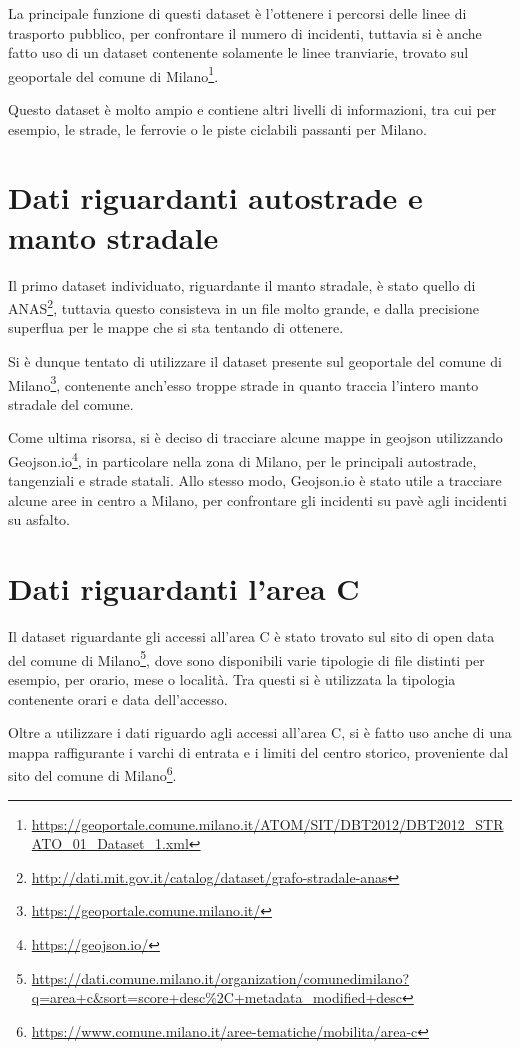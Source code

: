 \documentclass[a4paper]{report}
\begin{document}
La principale funzione di questi dataset è l'ottenere i percorsi delle linee di trasporto pubblico, 
per confrontare il numero di incidenti, tuttavia si è anche fatto uso di un dataset contenente 
solamente le linee tranviarie, trovato sul geoportale del comune di 
Milano\footnote{\url{https://geoportale.comune.milano.it/ATOM/SIT/DBT2012/DBT2012_STRATO_01_Dataset_1.xml}}.

Questo dataset è molto ampio e contiene altri livelli di informazioni, tra cui per esempio, 
le strade, le ferrovie o le piste ciclabili passanti per Milano. 

\section{Dati riguardanti autostrade e manto stradale}

Il primo dataset individuato, riguardante il manto  stradale, è stato quello di 
ANAS\footnote{\url{http://dati.mit.gov.it/catalog/dataset/grafo-stradale-anas}}, 
tuttavia questo consisteva in un file molto grande, e dalla precisione superflua per 
le mappe che si sta tentando di ottenere.

Si è dunque tentato di utilizzare il dataset presente sul geoportale del comune di 
Milano\footnote{\url{https://geoportale.comune.milano.it/}}, 
contenente anch'esso troppe strade in quanto traccia l'intero manto stradale del comune.

Come ultima risorsa, si è deciso di tracciare alcune mappe in geojson utilizzando 
Geojson.io\footnote{\url{https://geojson.io/}}, in particolare nella zona di Milano, 
per le principali autostrade, tangenziali e strade statali. 
Allo stesso modo, Geojson.io è stato utile a tracciare alcune aree in centro a Milano, 
per confrontare gli incidenti su pavè agli incidenti su asfalto.

\section{Dati riguardanti l'area C}

Il dataset riguardante gli accessi all'area C è stato trovato sul sito 
di open data del comune di 
Milano\footnote{\url{https://dati.comune.milano.it/organization/comunedimilano?q=area+c&sort=score+desc\%2C+metadata_modified+desc}}, 
dove sono disponibili varie tipologie di file distinti per esempio, per orario, 
mese o località. 
Tra questi si è utilizzata la tipologia contenente orari e data dell'accesso.

Oltre a utilizzare i dati riguardo agli accessi all'area C, si è fatto uso anche di una mappa 
raffigurante i varchi di entrata e i limiti del centro storico, 
proveniente dal sito del comune di 
Milano\footnote{\url{https://www.comune.milano.it/aree-tematiche/mobilita/area-c}}.
\end{document}

